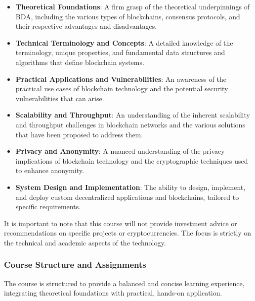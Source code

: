 \begin{itemize}
	\tightlist
	\item
	\textbf{Theoretical Foundations}: A firm grasp of the theoretical
	underpinnings of BDA, including the various types of blockchains,
	consensus protocols, and their respective advantages and
	disadvantages.
	\item
	\textbf{Technical Terminology and Concepts}: A detailed knowledge
	of the terminology, unique properties, and fundamental data structures
	and algorithms that define blockchain systems.
	\item
	\textbf{Practical Applications and Vulnerabilities}: An awareness of
	the practical use cases of blockchain technology and the potential
	security vulnerabilities that can arise.
	\item
	\textbf{Scalability and Throughput}: An understanding of the inherent
	scalability and throughput challenges in blockchain networks and the
	various solutions that have been proposed to address them.
	\item
	\textbf{Privacy and Anonymity}: A nuanced understanding of the privacy
	implications of blockchain technology and the cryptographic techniques
	used to enhance anonymity.
	\item
	\textbf{System Design and Implementation}: The ability to design,
	implement, and deploy custom decentralized applications and
	blockchains, tailored to specific requirements.
\end{itemize}

It is important to note that this course will not provide investment
advice or recommendations on specific projects or cryptocurrencies. The
focus is strictly on the technical and academic aspects of the
technology.

\subsubsection{Course Structure and
	Assignments}\label{course-structure-and-assignments}

The course is structured to provide a balanced and concise
learning experience, integrating theoretical foundations with practical,
hands-on application.

